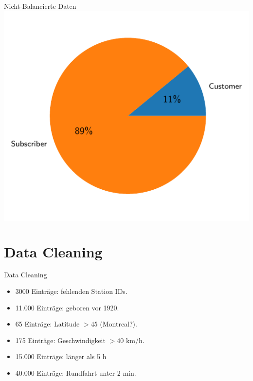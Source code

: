 \begin{frame}{Nicht-Balancierte Daten}
\centering
\includegraphics[height=0.9\textheight]{../Images/Piechart}
\end{frame}

\section{Data Cleaning}

\begin{frame}{Data Cleaning}
\centering
{}
{
\begin{itemize}
\item 3000 Einträge: fehlenden Station IDs.
\item 11.000 Einträge: geboren vor 1920.
\item 65 Einträge: Latitude $ > 45$ (Montreal?).
\item 175 Einträge: Geschwindigkeit $ > 40$ km/h.
\item 15.000 Einträge: länger als 5 h
\item 40.000 Einträge: Rundfahrt unter 2 min.
\end{itemize}
}
\end{frame}

